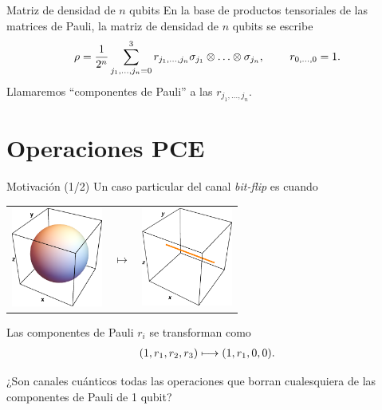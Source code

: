 \documentclass[xcolor=dvipsnames,presentation]{beamer}%
\begin{document}
\begin{frame}{Matriz de densidad de $n$ qubits}
	En la base de productos tensoriales de las matrices de Pauli, 
	la matriz de densidad de $n$ qubits se escribe
	\begin{align*}
		\rho = \frac{1}{2^n}\sum _{j_1,\ldots,j_n=0}^3 r_{j_1,\ldots,j_n}
		\sigma_{j_1}\otimes \ldots
		\otimes\sigma_{j_n},\hspace{.8cm} r_{0,\ldots,0}=1.
	\end{align*}
	\alert{Llamaremos ``componentes de Pauli'' a las $r_{j_1,\ldots,j_n}$.}
\end{frame}

\section{Operaciones PCE}
\label{sec:Theory}

\begin{frame}{Motivación (1/2)}
	Un caso particular del canal \textit{bit-flip} es cuando
	\begin{center}
	\begin{tabular}{m{2.5cm} m{1.5cm} m{2.5cm}}
		\includegraphics[width=3cm]{unit_sph}
		& \hfill \LARGE{$\longmapsto$}
		& \includegraphics[width=3cm]{bit_flip_p0_5}
	\end{tabular}
	\end{center}
	
	Las componentes de Pauli $r_i$ se transforman como
	\begin{align*}
	\qty(1,r_1,r_2,r_3)\longmapsto \qty(1,r_1,0,0).
	\end{align*}
	
	\alert{¿Son canales cuánticos todas las operaciones que borran
	cualesquiera de las componentes de Pauli de 1 qubit?}

\end{frame}
\end{document}
